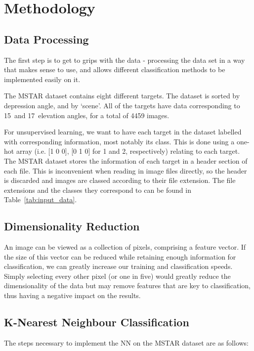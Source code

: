 \chapter{Methodology}

\section{Data Processing}
The first step is to get to grips with the data - processing the data set in a way that makes sense to use, and allows different classification methods to be implemented easily on it.

The MSTAR dataset contains eight different targets. The dataset is sorted by depression angle, and by `scene'. All of the targets have data corresponding to  15\degree~and 17\degree~elevation angles, for a total of 4459 images.

For unsupervised learning, we want to have each target in the dataset labelled with corresponding information, most notably its class. This is done using a one-hot array (i.e. [1 0 0], [0 1 0] for 1 and 2, respectively) relating to each target. The MSTAR dataset stores the information of each target in a header section of each file. This is inconvenient when reading in image files directly, so the header is discarded and images are classed according to their file extension. The file extensions and the classes they correspond to can be found in Table~\ref{tab:input_data}.


\section{Dimensionality Reduction}
An image can be viewed as a collection of pixels, comprising a feature vector. If the size of this vector can be reduced while retaining enough information for classification, we can greatly increase our training and classification speeds. Simply selecting every other pixel (or one in five) would greatly reduce the dimensionality of the data but may remove features that are key to classification, thus having a negative impact on the results.


\section{K-Nearest Neighbour Classification}
The steps necessary to implement the NN on the MSTAR dataset are as follows:\\

